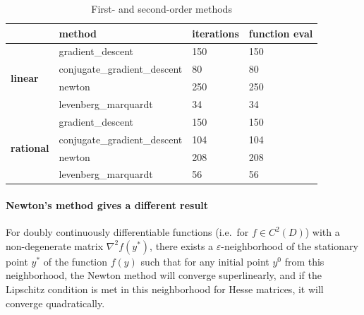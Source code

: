 \begin{table}[ht]
\caption{First- and second-order methods}
\begin{tabular}{l|l|l|l|}
\cline{2-4}
                                                         & \textbf{method}              & \textbf{iterations} & \textbf{function eval} \\ \hline
\multicolumn{1}{|l|}{\multirow{4}{*}{\textbf{linear}}}   & gradient\_descent            & 150                 & 150                    \\ \cline{2-4}
\multicolumn{1}{|l|}{}                                   & conjugate\_gradient\_descent & 80                  & 80                     \\ \cline{2-4}
\multicolumn{1}{|l|}{}                                   & newton                       & 250                 & 250                    \\ \cline{2-4}
\multicolumn{1}{|l|}{}                                   & levenberg\_marquardt         & 34                  & 34                     \\ \hline
\multicolumn{1}{|l|}{\multirow{4}{*}{\textbf{rational}}} & gradient\_descent            & 150                 & 150                    \\ \cline{2-4}
\multicolumn{1}{|l|}{}                                   & conjugate\_gradient\_descent & 104                 & 104                    \\ \cline{2-4}
\multicolumn{1}{|l|}{}                                   & newton                       & 208                 & 208                    \\ \cline{2-4}
\multicolumn{1}{|l|}{}                                   & levenberg\_marquardt         & 56                  & 56                     \\ \hline
\end{tabular}
\label{tbl:order}
\end{table}

\paragraph{Newton's method gives a different result}

\begin{theorem}
    \label{theorem:conv_newton}
    For doubly continuously differentiable functions (i.e.\ for $f \in C^2(D)$) with a non-degenerate matrix $\nabla^2 f(y^*)$, there exists a $\varepsilon$-neighborhood of the stationary point $y^*$ of the function $f(y)$ such that for any initial point $y^0$ from this neighborhood, the Newton method will converge superlinearly, and if the Lipschitz condition is met in this neighborhood for Hesse matrices, it will converge quadratically.
\end{theorem}

